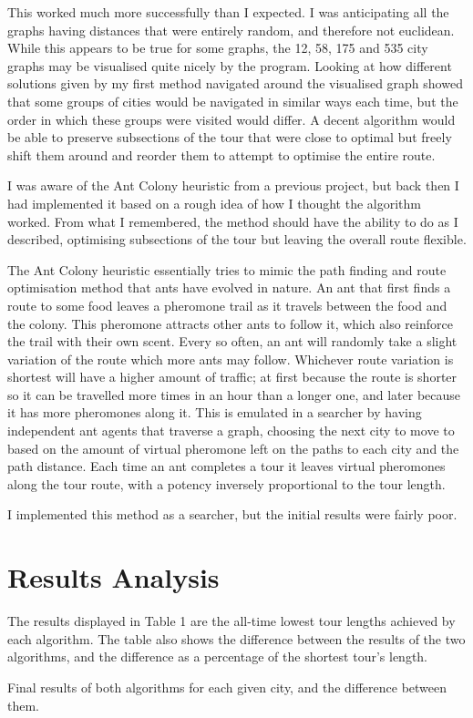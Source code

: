 \documentclass[a4paper,11pt]{article}
\begin{document}
This worked much more successfully than I expected. I was anticipating all the
graphs having distances that were entirely random, and therefore not euclidean.
While this appears to be true for some graphs, the 12, 58, 175 and 535 city
graphs may be visualised quite nicely by the program. Looking at how different
solutions given by my first method navigated around the visualised graph showed
that some groups of cities would be navigated in similar ways each time, but
the order in which these groups were visited would differ. A decent algorithm
would be able to preserve subsections of the tour that were close to optimal
but freely shift them around and reorder them to attempt to optimise the entire
route.

I was aware of the Ant Colony heuristic from a previous project, but back then
I had implemented it based on a rough idea of how I thought the algorithm
worked. From what I remembered, the method should have the ability to do as I
described, optimising subsections of the tour but leaving the overall route
flexible.

The Ant Colony heuristic essentially tries to mimic the path finding and route
optimisation method that ants have evolved in nature. An ant that first finds a
route to some food leaves a pheromone trail as it travels between the food and
the colony. This pheromone attracts other ants to follow it, which also
reinforce the trail with their own scent. Every so often, an ant will randomly
take a slight variation of the route which more ants may follow. Whichever
route variation is shortest will have a higher amount of traffic; at first
because the route is shorter so it can be travelled more times in an hour than
a longer one, and later because it has more pheromones along it. This is
emulated in a searcher by having independent ant agents that traverse a graph,
choosing the next city to move to based on the amount of virtual pheromone left
on the paths to each city and the path distance. Each time an ant completes a
tour it leaves virtual pheromones along the tour route, with a potency 
inversely proportional to the tour length.

I implemented this method as a searcher, but the initial results were fairly
poor.

\section{Results Analysis}
The results displayed in Table 1 are the all-time lowest tour lengths
achieved by each algorithm. The table also shows the difference between the
results of the two algorithms, and the difference as a percentage of the
shortest tour's length.

\begin{table}[l]

\caption{Final results of both algorithms for each given city, and the
	difference between them.}
\end{table}

\lipsum[1-5]
\end{document}
